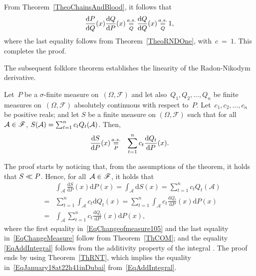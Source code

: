 \documentclass[lettersize,onecolumn]{IEEEtran}
\begin{document}
\begin{IEEEproof}
From Theorem~\ref{TheoChainsAndBlood}, it follows that 
\begin{eqnarray}
\label{EqSomebodyCalls}
\frac{\mathrm{d} P}{\mathrm{d} Q} (x) \frac{\mathrm{d} Q}{\mathrm{d} P} (x)  \displaystyle\mathop{ \stackrel{a.s.}{=}}_{Q} \frac{\mathrm{d} Q}{\mathrm{d}Q}(x) \displaystyle\mathop{ \stackrel{a.s.}{=}}_{Q}  1,
\end{eqnarray}
%
where the last equality follows from Theorem~\ref{TheoRNDOne}, with~$c~=~1$. This completes the  proof.
\end{IEEEproof}
The subsequent folklore theorem establishes the linearity of the Radon-Nikodym derivative.
\begin{theorem}[Linearity]\label{TheoRNDadditivity}
Let~$P$ be a $\sigma$-ﬁnite measure on~$\left(\Omega, \mathscr{F}\right)$ and let also~$Q_1 , Q_2 , \ldots , Q_n$ be ﬁnite measures on~$\left(\Omega, \mathscr{F}\right)$ absolutely continuous with respect to~$P$. Let~$c_1 , c_2 , \ldots , c_n$ be positive reals; and let $S$ be a finite measure on $\left(\Omega, \mathscr{F}\right)$ such that for all~$\mathcal A \in \mathscr{F}$, 
$S(\mathcal A) = \sum_{t=1}^n c_t Q_t(\mathcal A)$.
Then,  
\begin{eqnarray}
\label{EqJanuary18at22h41inDubai}
\frac{\mathrm{d} S}{\mathrm{d}P}(x) & \displaystyle\mathop{ \stackrel{a.s.}{=}}_{P} & \sum_{t =1}^{n} c_t \frac{\mathrm{d}Q_t}{\mathrm{d}P} (x).
\end{eqnarray}
\end{theorem}
\begin{IEEEproof}
%
The proof starts by noticing that, from the assumptions of the theorem, it holds that ${S}\ll{P}$. Hence, for all~$\mathcal A \in \mathscr{F}$, it holds that
\begin{eqnarray} \label{EqProofTheoRNDadditivity2}
\label{EqChangeofmeasure105}
 & &  \int_{\mathcal{A}} \frac{\mathrm{d} S}{\mathrm{d}P}(x) \mathrm{d} P(x)  = \int_{\mathcal{A}}\mathrm{d} S(x)  =  \sum_{t=1}^n c_t Q_t(\mathcal{A}) \\ 
\label{EqChangeMeasure}
&= &\sum_{t=1}^n \int_{\mathcal{A}} c_t \mathrm{d} Q_t(x)   = \sum_{t=1}^n \int_{\mathcal{A}} c_t \frac{ \mathrm{d} Q_t}{\mathrm{d}P}(x) \mathrm{d} P(x) \\ 
\label{EqAddIntegral}
&= &\int_{\mathcal{A}} \sum_{t=1}^n c_t \frac{ \mathrm{d} Q_t}{\mathrm{d}P}(x) \mathrm{d} P(x),
\end{eqnarray}
where the first equality in~\eqref{EqChangeofmeasure105} and  the last equality in~\eqref{EqChangeMeasure} follow from Theorem~\ref{ThCOM}; and the equality 
\eqref{EqAddIntegral} follows from the additivity property of the integral \cite[Corollary~1.6.4]{ash2000probability}.
%
The proof ends by using Theorem~\ref{ThRNT}, which  implies the equality in~\eqref{EqJanuary18at22h41inDubai} from~\eqref{EqAddIntegral}.
\end{IEEEproof}
\end{document}
